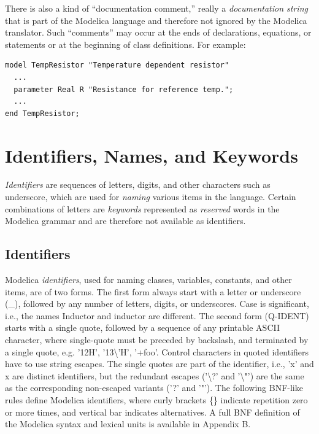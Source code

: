 \documentclass[10pt,a4paper]{report}
\begin{document}
There is also a kind of ``documentation comment,'' really a
\emph{documentation string} that is part of the Modelica language and
therefore not ignored by the Modelica translator. Such ``comments'' may
occur at the ends of declarations, equations, or statements or at the
beginning of class definitions. For example:

\begin{lstlisting}[language=modelica]
model TempResistor "Temperature dependent resistor"
  ...
  parameter Real R "Resistance for reference temp.";
  ...
end TempResistor;
\end{lstlisting}
\section{Identifiers, Names, and Keywords}

\emph{Identifiers} are sequences of letters, digits, and other
characters such as underscore, which are used for \emph{naming} various
items in the language. Certain combinations of letters are
\emph{keywords} represented as \emph{reserved} words in the Modelica
grammar and are therefore not available as identifiers.

\subsection{Identifiers}

Modelica \emph{identifiers}, used for naming classes, variables,
constants, and other items, are of two forms. The first form always
start with a letter or underscore (\_), followed by any number of
letters, digits, or underscores. Case is significant, i.e., the names
Inductor and inductor are different. The second form (Q-IDENT) starts
with a single quote, followed by a sequence of any printable ASCII
character, where single-quote must be preceded by backslash, and
terminated by a single quote, e.g. '12H', '13\textbackslash{}'H',
'+foo'. Control characters in quoted identifiers have to use string
escapes. The single quotes are part of the identifier, i.e., 'x' and x
are distinct identifiers, but the redundant escapes ('\textbackslash{}?'
and '\textbackslash{}"') are the same as the corresponding non-escaped
variants ('?' and '"'). The following BNF-like rules define Modelica
identifiers, where curly brackets \{\} indicate repetition zero or more
times, and vertical bar \textbar{} indicates alternatives. A full BNF
definition of the Modelica syntax and lexical units is available in
Appendix B.
\end{document}
